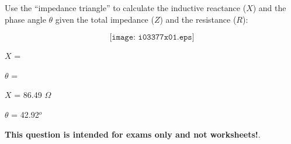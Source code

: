 

Use the ``impedance triangle'' to calculate the inductive reactance ($X$) and the phase angle $\theta$ given the total impedance ($Z$) and the resistance ($R$):

$$\texttt{[image: i03377x01.eps]}$$

\vskip 20pt

$X$ = 

\vskip 10pt

$\theta$ = 







$X$ = 86.49 $\Omega$

\vskip 10pt

$\theta$ = 42.92$^{o}$







{\bf This question is intended for exams only and not worksheets!}.



